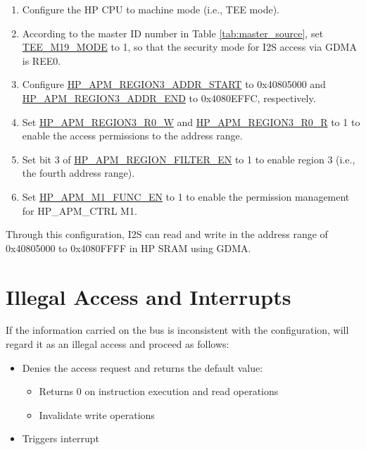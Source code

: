 \documentclass[main\_\_EN.tex]{subfiles}
\begin{document}
\begin{enumerate}

    \item Configure the HP CPU to machine mode (i.e., TEE mode).

    \item According to the master ID number in Table \ref{tab:master_source}, set \hyperref[fielddesc:TEEMNMODE]{TEE\_M19\_MODE} to 1, so that the security mode for I2S access via GDMA is REE0.

    \item Configure \hyperref[regdesc:HPAPMREGIONNADDRSTARTREG]{HP\_APM\_REGION3\_ADDR\_START} to 0x40805000 and \hyperref[regdesc:HPAPMREGIONNADDRSTARTREG]{HP\_APM\_REGION3\_ADDR\_END} to 0x4080EFFC, respectively.

    \item Set \hyperref[fielddesc:HPAPMREGIONNR0W]{HP\_APM\_REGION3\_R0\_W} and \hyperref[fielddesc:HPAPMREGIONNR0R]{HP\_APM\_REGION3\_R0\_R} to 1 to enable the access permissions to the address range.

    \item Set bit 3 of \hyperref[fielddesc:HPAPMREGIONFILTEREN]{HP\_APM\_REGION\_FILTER\_EN} to 1 to enable region 3 (i.e., the fourth address range).

    \item Set \hyperref[fielddesc:HPAPMM1FUNCEN]{HP\_APM\_M1\_FUNC\_EN} to 1 to enable the permission management for HP\_APM\_CTRL M1.

\end{enumerate}

Through this configuration, I2S can read and write in the address range of 0x40805000 to 0x4080FFFF in HP SRAM using GDMA.

\section{Illegal Access and Interrupts}

If the information carried on the bus is inconsistent with the configuration, \chipname{} will regard it as an illegal access and proceed as follows:

\begin{itemize}
    \item Denies the access request and returns the default value:
    \begin{itemize}
        \item Returns 0 on instruction execution and read operations
        \item Invalidate write operations
    \end{itemize}
    \item Triggers interrupt
\end{itemize}
\end{document}
